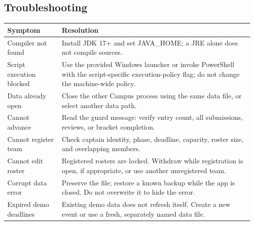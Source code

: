 \subsection{Troubleshooting}
\begin{tabularx}{\linewidth}{lY}\toprule Symptom & Resolution\\\midrule
Compiler not found & Install JDK 17+ and set JAVA\_HOME; a JRE alone does not compile sources.\\
Script execution blocked & Use the provided Windows launcher or invoke PowerShell with the script-specific execution-policy flag; do not change the machine-wide policy.\\
Data already open & Close the other Campus process using the same data file, or select another data path.\\
Cannot advance & Read the guard message: verify entry count, all submissions, reviews, or bracket completion.\\
Cannot register team & Check captain identity, phase, deadline, capacity, roster size, and overlapping members.\\
Cannot edit roster & Registered rosters are locked. Withdraw while registration is open, if appropriate, or use another unregistered team.\\
Corrupt data error & Preserve the file; restore a known backup while the app is closed. Do not overwrite it to hide the error.\\
Expired demo deadlines & Existing demo data does not refresh itself. Create a new event or use a fresh, separately named data file.\\\bottomrule\end{tabularx}
